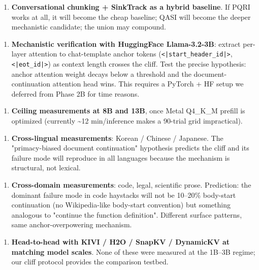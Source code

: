 \documentclass[11pt]{article}
\begin{document}
\begin{enumerate}
\item \textbf{Conversational chunking + SinkTrack as a hybrid baseline}. If PQRI works at all, it will become the cheap baseline; QASI will become the deeper mechanistic candidate; the union may compound.
\end{enumerate}


\begin{enumerate}
\item \textbf{Mechanistic verification with HuggingFace Llama-3.2-3B}: extract per-layer attention to chat-template anchor tokens (\texttt{<|start\_header\_id|>}, \texttt{<|eot\_id|>}) as context length crosses the cliff. Test the precise hypothesis: anchor attention weight decays below a threshold and the document-continuation attention head wins. This requires a PyTorch + HF setup we deferred from Phase 2B for time reasons.
\end{enumerate}


\begin{enumerate}
\item \textbf{Ceiling measurements at 8B and 13B}, once Metal Q4\_K\_M prefill is optimized (currently \textasciitilde{}12 min/inference makes a 90-trial grid impractical).
\end{enumerate}


\begin{enumerate}
\item \textbf{Cross-lingual measurements}: Korean / Chinese / Japanese. The "primacy-biased document continuation" hypothesis predicts the cliff and its failure mode will reproduce in all languages because the mechanism is structural, not lexical.
\end{enumerate}


\begin{enumerate}
\item \textbf{Cross-domain measurements}: code, legal, scientific prose. Prediction: the dominant failure mode in code haystacks will not be 10–20\% body-start continuation (no Wikipedia-like body-start convention) but something analogous to "continue the function definition". Different surface patterns, same anchor-overpowering mechanism.
\end{enumerate}


\begin{enumerate}
\item \textbf{Head-to-head with KIVI / H2O / SnapKV / DynamicKV at matching model scales}. None of these were measured at the 1B–3B regime; our cliff protocol provides the comparison testbed.
\end{enumerate}
\end{document}
